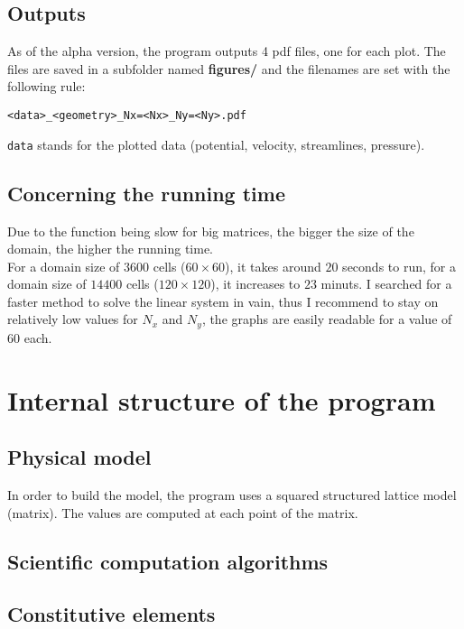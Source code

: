 \subsection{Outputs}
As of the alpha version, the program outputs 4 pdf files, one for each plot.
The files are saved in a subfolder named \textbf{figures/} and the filenames
are set with the following rule:\\
\begin{center}
      \texttt{<data>_<geometry>_Nx=<Nx>_Ny=<Ny>.pdf}
\end{center}
\texttt{data} stands for the plotted data (potential, velocity,
streamlines, pressure).
\subsection{Concerning the running time}
Due to the function  being slow for
big matrices, the bigger the size of the domain, the higher the running time.\\
For a domain size of $\num{3600}$ cells ($\num{60} \times \num{60}$), it takes
around $\num{20}$ seconds to run, for a domain size of $\num{14400}$ cells
($\num{120} \times \num{120}$), it increases to $\num{23}$ minuts. 
\smallbreak{}
I searched for a faster method to solve the linear system in vain, thus I
recommend to stay on relatively low values for $N_x$ and $N_y$, the graphs are
easily readable for a value of $\num{60}$ each.\\

\section{Internal structure of the program}
\subsection{Physical model}
In order to build the model, the program uses a squared structured lattice
model (matrix). The values are computed at each point of the matrix.

\subsection{Scientific computation algorithms}


\subsection{Constitutive elements}
